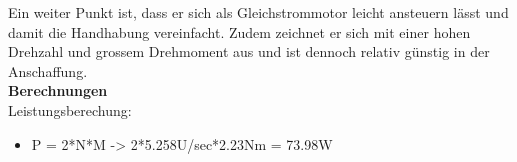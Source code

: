 Ein weiter Punkt ist, dass er sich als Gleichstrommotor leicht ansteuern lässt und damit die Handhabung vereinfacht.
Zudem zeichnet er sich mit einer hohen Drehzahl und grossem Drehmoment aus und ist dennoch relativ günstig in der Anschaffung.\\[0.2cm]
\textbf{Berechnungen}\\[0.2cm]
Leistungsberechung:
\begin{itemize}
\item P = 2*\pi*N*M -> 2*\pi*5.258U/sec*2.23Nm = 73.98W


\end{itemize}